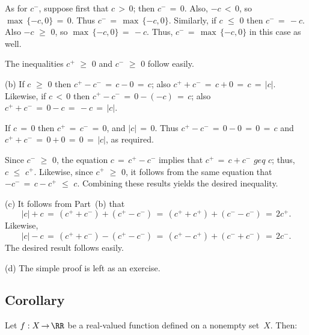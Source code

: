 {       As for $c^{-}$, suppose first that $c\,>\,0$; then $c^{-} \,=\, 0$. Also, $-c\,<\,0$, so ${\max}\,\{-c,0\} \,=\, 0$.
    Thus $c^{-} \,=\, {\max}\,\{-c,0\}$. Similarly, if $c\,\,{\leq}\,\,0$ then $c^{-} \,=\, -c$. Also $-c\,\,{\geq}\,\,0$, so ${\max}\,\{-c,0\} \,=\, -c$.
    Thus, $c^{-} \,=\, {\max}\,\{-c,0\}$ in this case as well.

        The inequalities $c^{+}\,\,{\geq}\,\,0$ and $c^{-}\,\,{\geq}\,\,0$ follow easily.

\V

        (b) If $c\,\,{\geq}\,\,0$ then $c^{+}-c^{-} \,=\, c-0 \,=\, c$;
    also $c^{+}+c^{-} \,=\, c+0 \,=\, c \,=\, |c|$.
    Likewise, if $c\,<\,0$ then $c^{+}-c^{-} \,=\, 0-(-c) \,=\, c$; also $c^{+}+c^{-} \,=\, 0-c \,=\, -c \,=\, |c|$.

        If $c \,=\, 0$ then $c^{+} \,=\, c^{-} \,=\, 0$, and $|c| \,=\, 0$.
    Thus $c^{+}-c^{-} \,=\, 0-0 \,=\, 0 \,=\, c$ and $c^{+}+c^{-} \,=\, 0+0 \,=\, 0 \,=\, |c|$, as required.

        Since $c^{-}\,\,{\geq}\,\,0$, the equation $c \,=\, c^{+}-c^{-}$ implies that $c^{+}\,=\,c+c^{-}\,\,{geq}\,\,c$; thus, $c\,\,{\leq}\,\,c^{+}$.
    Likewise, since $c^{+}\,\,{\geq}\,\,0$, it follows from the same equation that $-c^{-} \,=\, c-c^{+}\,\,{\leq}\,\,c$.
    Combining these results yields the desired inequality.
    

\V

        (c) It follows from Part~(b) that
        \begin{displaymath}
        |c| + c \,=\, (c^{+}+c^{-}) + (c^{+}-c^{-}) \,=\, (c^{+}+c^{+}) + (c^{-}-c^{-}) \,=\, 2c^{+}.
        \end{displaymath}
    Likewise,
        \begin{displaymath}
        |c| - c \,=\, (c^{+}+c^{-}) - (c^{+}-c^{-}) \,=\, (c^{+}-c^{+}) + (c^{-}+c^{-}) \,=\, 2c^{-}.
        \end{displaymath}
    The desired result follows easily.

\V

        (d) The simple proof is left as an exercise.

\V

            \subsection{\small{\bf Corollary}}
            \label{CorB20.105}
       Let $f:X \,{\rightarrow}\, {\RR}$ be a real-valued function defined on a nonempty set~$X$. Then:

}

